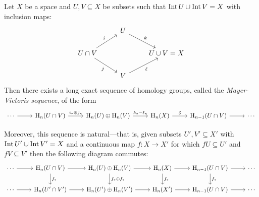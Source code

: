 \begin{theorem}
\label{thm:mayer-vietoris}
Let \(X\) be a space and \(U, V \subseteq X\) be subsets such that
\(\operatorname{Int} U \cup \operatorname{Int} V = X\) with inclusion maps:
\[
\begin{tikzcd}
&U \ar[rd, "k"] & \\
U \cap V \ar[ur, "i"] \ar[rd, "j"'] & &U \cup V = X \\
&V \ar[ru, "\ell"']&
\end{tikzcd}
\]
Then there exists a long exact sequence of homology
groups, called the \emph{Mayer-Vietoris sequence}, of the form
{\small
\[
\begin{tikzcd}
\cdots \ar[r]
&\Hmlg_n(U \cap V) \ar[r, "i_* \oplus j_{*}"]
&\Hmlg_n(U) \oplus \Hmlg_n(V) \ar[r, "k_{*} - \ell_{*}"]
&\Hmlg_n(X) \ar[r, "\delta"]
&\Hmlg_{n-1}(U \cap V) \ar[r]
&\cdots
\end{tikzcd}
\]
}

Moreover, this sequence is natural---that is, given subsets
\(U', V' \subseteq X'\) with \(\operatorname{Int} U' \cup \operatorname{Int} V' = X\) and a continuous map
\(f: X \to X'\) for which \(f U \subseteq U'\) and \(f V \subseteq V'\) then the following diagram
commutes:
{\small
\[
\begin{tikzcd}
\cdots \ar[r]
&\Hmlg_n(U \cap V) \ar[r]
\ar[d, "f_{*}"]
&\Hmlg_n(U) \oplus \Hmlg_n(V) \ar[r]
\ar[d, "f_{*} \oplus f_{*}"]
&\Hmlg_n(X) \ar[r]
\ar[d, "f_{*}"]
&\Hmlg_{n-1}(U \cap V) \ar[r]
\ar[d, "f_{*}"]
&\cdots
\\
\cdots \ar[r]
&\Hmlg_n(U' \cap V') \ar[r]
&\Hmlg_n(U') \oplus \Hmlg_n(V') \ar[r]
&\Hmlg_n(X') \ar[r]
&\Hmlg_{n-1}(U \cap V) \ar[r]
&\cdots
\end{tikzcd}
\]
}
\end{theorem}

